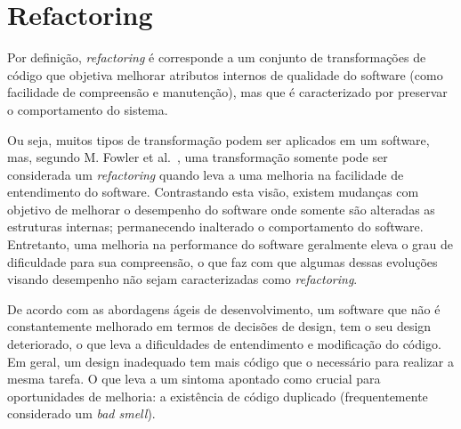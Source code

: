 \section{Refactoring}\label{sec:refactoring}

Por defini\c{c}\~{a}o, \textit{refactoring} \'{e} corresponde a 
um conjunto de transforma\c c\~{o}es  
de c\'{o}digo que objetiva melhorar atributos internos de qualidade  
do software (como facilidade de compreens\~{a}o e 
manuten\c c\~{a}o), mas que \'{e} caracterizado por preservar o comportamento do 
sistema. 

Ou seja, muitos tipos de transforma\c c\~{a}o 
podem ser aplicados em um software, mas, segundo M. Fowler et al.~\cite{martinFowlerRafactoring}, 
uma transforma\c c\~{a}o somente pode ser considerada um \textit{refactoring} quando 
leva a uma melhoria na facilidade de entendimento do software. 
Contrastando esta vis\~{a}o, existem mudan\c{c}as com objetivo de melhorar o desempenho do 
software onde somente s\~{a}o alteradas as estruturas internas; permanecendo inalterado o comportamento do software. 
Entretanto, uma melhoria na performance do software geralmente eleva o grau de dificuldade para sua 
compreens\~{a}o, o que faz com que algumas dessas evolu\c{c}\~{o}es visando desempenho n\~{a}o sejam 
caracterizadas como \textit{refactoring}.


De acordo com as abordagens \'{a}geis de 
desenvolvimento, um software que n\~{a}o \'{e} constantemente melhorado em 
termos de decis\~{o}es de design, tem o seu design deteriorado, 
o que leva a dificuldades de entendimento e modifica\c c\~{a}o do c\'{o}digo. 
Em geral, um design inadequado tem mais c\'{o}digo 
que o necess\'{a}rio para realizar a mesma tarefa. O que leva a um sintoma apontado 
como crucial para oportunidades de melhoria: 
a exist\^{e}ncia de código duplicado (frequentemente considerado um 
\emph{bad smell}). 

